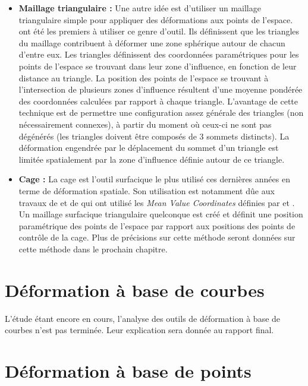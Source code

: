 \begin{itemize}
\item{\textbf{Maillage triangulaire :}} Une autre idée est d'utiliser   un
maillage triangulaire simple pour appliquer des déformations aux   points de
l'espace. \cite{KO03} ont été les premiers à utiliser ce   genre d'outil. Ils
définissent que les triangles du maillage   contribuent à déformer une zone
sphérique autour de chacun d'entre   eux. Les triangles définissent des
coordonnées paramétriques pour   les points de l'espace se trouvant dans leur
zone d'influence, en   fonction de leur distance au triangle. La position des
points de   l'espace se trouvant à l'intersection de plusieurs zones d'influence
résultent d'une moyenne pondérée des coordonnées calculées par   rapport à
chaque triangle. L'avantage de cette technique est de   permettre une
configuration assez générale des triangles (non   nécessairement connexes), à
partir du moment où ceux-ci ne sont pas   dégénérés (les triangles doivent être
composés de 3 sommets   distincts). La déformation engendrée par le déplacement
du sommet   d'un triangle est limitée spatialement par la zone d'influence
définie autour de ce triangle.

\item{\textbf{Cage :}} La cage est l'outil surfacique le plus utilisé ces
dernières années en terme de déformation spatiale. Son utilisation est notamment
dûe aux travaux de \cite{JSW05} et de \cite{HF06} qui ont utilisé les
\textit{Mean Value Coordinates} définies par \cite{Flo03} et \cite{FKR05}. Un
maillage surfacique triangulaire quelconque est créé et définit une position
paramétrique des points de l'espace par rapport aux positions des points de
contrôle de la cage. Plus de précisions sur cette méthode seront données sur
cette méthode dans le prochain chapitre.

\end{itemize}

\section{Déformation à base de courbes} L'étude étant encore en cours, l'analyse
des outils de déformation à base de courbes n'est pas terminée. Leur explication
sera donnée au rapport final.

\section{Déformation à base de points}

